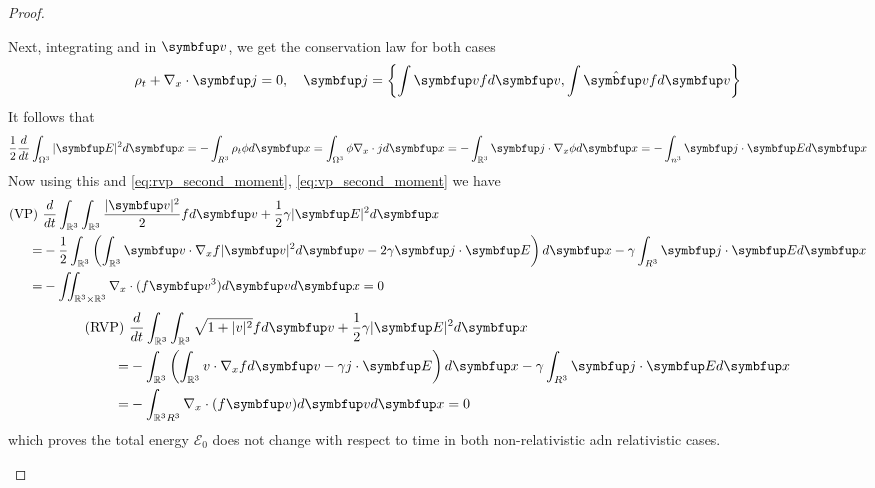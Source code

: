 \begin{proof}
\begin{enumerate}[(a)]
      Next, integrating \eqvp and \eqrvp in $\vv$, we get the conservation law for both cases
      \[
      \rho_{t}+\nabla_{x} \cdot \vj=0, \quad \vect{j}=\left\{\int \vv f d \vv, \int \hat{\vv} f d \vv\right\}
      \]
      It follows that
      \[
      \frac{1}{2} \frac{d}{d t} \int_{\Omega^{3}}|\vE|^{2} d \vx=-\int_{R^{3}} \rho_{t} \phi d \vx=\int_{\Omega^{3}} \phi \nabla_{x} \cdot j d \vx=-\int_{\mathbb{R}^{3}} \vj \cdot \nabla_{x} \phi d \vx=-\int_{n^{3}} \vj \cdot \vE d \vx
      \]
      Now using this and \eqref{eq:rvp_second_moment}, \eqref{eq:vp_second_moment} we have
      \[
      \begin{aligned}
      \text{(VP) }&\frac{d}{d t} \int_{\mathbb{R}^{3}}\int_{\mathbb{R}^{3}} \frac{|\vv|^{2}}{2} f d \vv+\frac{1}{2} \gamma|\vE|^{2} d \vx\\ =&-\frac{1}{2} \int_{\mathbb{R}^{3}}\left(\int_{\mathbb{R}^{3}} \vv \cdot \nabla_{x}   f  |\vv|^2 d \vv-2\gamma \vj \cdot \vE\right) d \vx-\gamma \int_{R^{3}} \vj \cdot \vE d \vx \\
      =&-\iint_{\mathbb{R}^{3}\times \bbR^{3}} \nabla_{x} \cdot(f \vv^3) d \vv d \vx=0
      \end{aligned}
      \]
      \[
      \begin{aligned}
        \text{(RVP) }&\frac{d}{d t} \int_{\mathbb{R}^{3}}\int_{\mathbb{R}^{3}} \sqrt{1+|v|^{2}} f d \vv+\frac{1}{2} \gamma|\vE|^{2} d \vx\\ =&-\int_{\mathbb{R}^{3}}\left(\int_{\mathbb{R}^{3}} v \cdot \nabla_{x} f d \vv-\gamma j \cdot \vE\right) d \vx-\gamma \int_{R^{3}} \vj \cdot \vE d \vx \\
        =&-\int_{\mathbb{R}^{3} R^{3}} \nabla_{x} \cdot(f \vv) d \vv d \vx=0
        \end{aligned}
      \]
      which proves the total energy $\mathcal{E}_0$ does not change with respect to time in both non-relativistic adn relativistic cases.

    \end{enumerate}

\end{proof}
